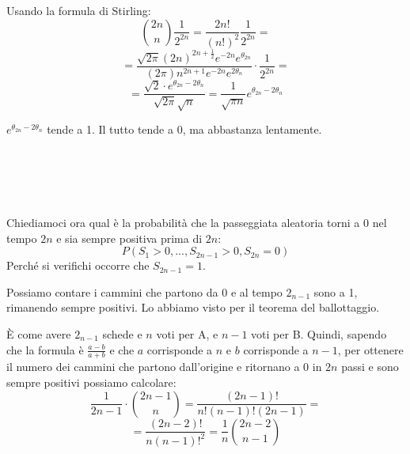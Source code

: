 \documentclass[a4paper,12pt]{book}
\newcommand\ddfrac[2]{\frac{\displaystyle #1}{\displaystyle #2}}
\begin{document}
Usando la formula di Stirling:
	$$ \binom{2n}{n} \frac{1}{2^{2n}} = \frac{2n!}{(n!)^2} \frac{1}{2^{2n}} = $$
	$$ = \ddfrac{\sqrt{2\pi}(2n)^{2n+\frac{1}{2}}e^{-2n} e^{\theta_{2n}}}{ (2\pi)n^{2n+1}e^{-2n}e^{2\theta_n}    }\cdot \frac{1}{2^{2n}} = $$
	$$ = \ddfrac{\sqrt{2} \cdot e^{\theta_{2n} - 2\theta_n}   } { \sqrt{2\pi}\sqrt{n}} = \frac{1}{\sqrt{\pi n}} e^{\theta_{2n} - 2\theta_n} $$

$ e^{\theta_{2n} - 2\theta_n} $ tende a 1. Il tutto tende a 0, ma abbastanza lentamente. 
\\
\\
\\
\\
\\
\\
Chiediamoci ora qual è la probabilità che la passeggiata aleatoria torni a 0 nel tempo $ 2n $ e sia sempre positiva prima di $ 2n $:
$$P(S_1 > 0, ..., S_{2n-1}>0, S_{2n} = 0)$$
Perché si verifichi occorre che $ S_{2n-1} = 1 $.
\begin{multicols}{2}
	Possiamo contare i cammini che partono da 0 e al tempo $ 2_{n-1} $ sono a 1, rimanendo sempre positivi. Lo abbiamo visto per il teorema del ballottaggio. 
	
	
	\begin{center}
	\end{center}
\end{multicols}

È come avere $ 2_{n-1} $ schede e $ n $ voti per A, e $ n-1 $ voti per B. Quindi, sapendo che la formula è $ \frac{a-b}{a+b} $ e che $ a $ corrisponde a $ n $ e $ b $ corrisponde a $ n-1 $, per ottenere il numero dei cammini che partono dall'origine e ritornano a 0 in $ 2n $ passi e sono sempre positivi possiamo calcolare:
$$ \frac{1}{2n-1} \cdot \binom{2n-1}{n} = \frac{(2n-1)!}{n!(n-1)!(2n-1)} = $$
$$ = \frac{(2n-2)!}{n(n-1)!^2} = \frac{1}{n} \binom{2n-2}{n-1} $$
\end{document}
